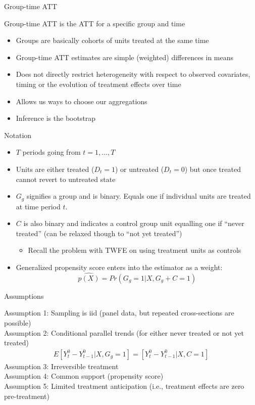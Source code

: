 \documentclass{beamer}
\begin{document}
\begin{frame}{Group-time ATT}

Group-time ATT is the ATT for a specific group and time
\begin{itemize}
\item Groups are basically cohorts of units treated at the same time
\item Group-time ATT estimates are simple (weighted) differences in means
\item Does not directly restrict heterogeneity with respect to observed covariates, timing or the evolution of treatment effects over time
\item Allows us ways to choose our aggregations
\item Inference is the bootstrap
\end{itemize}

\end{frame}



\begin{frame}{Notation}

\begin{itemize}
\item $T$ periods going from $t=1, \dots, T$
\item Units are either treated ($D_t=1$) or untreated ($D_t=0$) but once treated cannot revert to untreated state
\item $G_g$ signifies a group and is binary.  Equals one if individual units are treated at time period $t$.
\item $C$ is also binary and indicates a control group unit equalling one if ``never treated'' (can be relaxed though to ``not yet treated'')
	\begin{itemize}
	\item Recall the problem with TWFE on using treatment units as controls
	\end{itemize}
\item Generalized propensity score enters into the estimator as a weight: $$\widehat{p(X)} = Pr(G_g=1 | X,G_g+C=1)$$
\end{itemize}

\end{frame}

\begin{frame}{Assumptions}

Assumption 1: Sampling is iid (panel data, but repeated cross-sections are possible) \\
\bigskip
Assumption 2: Conditional parallel trends (for either never treated or not yet treated) \\
\begin{eqnarray*}
E[Y_t^0 - Y_{t-1}^0 | X,G_g=1] = [Y_t^0 - Y_{t-1}^0 | X,C=1] 
\end{eqnarray*}
\bigskip
Assumption 3: Irreversible treatment \\
Assumption 4: Common support (propensity score) \\
\bigskip
Assumption 5: Limited treatment anticipation (i.e., treatment effects are zero pre-treatment)

\end{frame}
\end{document}
